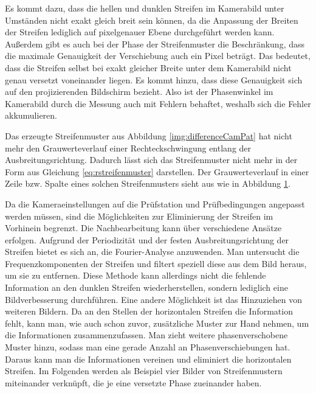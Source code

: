 \noindent
Es kommt dazu, dass die hellen und dunklen Streifen im Kamerabild unter Umständen nicht exakt gleich breit sein können, da die Anpassung der Breiten der Streifen lediglich auf pixelgenauer Ebene durchgeführt werden kann.
Außerdem gibt es auch bei der Phase der Streifenmuster die Beschränkung, dass die maximale Genauigkeit der Verschiebung auch ein Pixel beträgt.
Das bedeutet, dass die Streifen selbst bei exakt gleicher Breite unter dem Kamerabild nicht genau versetzt voneinander liegen.
Es kommt hinzu, dass diese Genauigkeit sich auf den projizierenden Bildschirm bezieht.
Also ist der Phasenwinkel im Kamerabild durch die Messung auch mit Fehlern behaftet, weshalb sich die Fehler akkumulieren.

\p
Das erzeugte Streifenmuster aus Abbildung \ref{img:differenceCamPat} hat nicht mehr den Grauwerteverlauf einer Rechteckschwingung entlang der Ausbreitungsrichtung.
Dadurch lässt sich das Streifenmuster nicht mehr in der Form aus Gleichung \ref{eq:rstreifenmuster} darstellen.
Der Grauwerteverlauf in einer Zeile bzw. Spalte eines solchen Streifenmusters sieht aus wie in Abbildung \ref{tikz:abbPulsewave}.
%
{
	\begin{figure}[H]
		\centering
		
		\label{tikz:abbPulsewave}
	\end{figure}
}
\p
Da die Kameraeinstellungen auf die Prüfstation und Prüfbedingungen angepasst werden müssen, sind die Möglichkeiten zur Eliminierung der Streifen im Vorhinein begrenzt.
Die Nachbearbeitung kann über verschiedene Ansätze erfolgen.
Aufgrund der Periodizität und der festen Ausbreitungsrichtung der Streifen bietet es sich an, die Fourier-Analyse anzuwenden.
Man untersucht die Frequenzkomponenten der Streifen und filtert speziell diese aus dem Bild heraus, um sie zu entfernen.
Diese Methode kann allerdings nicht die fehlende Information an den dunklen Streifen wiederherstellen, sondern lediglich eine Bildverbesserung durchführen.
Eine andere Möglichkeit ist das Hinzuziehen von weiteren Bildern.
Da an den Stellen der horizontalen Streifen die Information fehlt, kann man, wie auch schon zuvor, zusätzliche Muster zur Hand nehmen, um die Informationen zusammenzufassen.
Man zieht weitere phasenverschobene Muster hinzu, sodass man eine gerade Anzahl an Phasenverschiebungen hat.
Daraus kann man die Informationen vereinen und eliminiert die horizontalen Streifen.
Im Folgenden werden als Beispiel vier Bilder von Streifenmustern miteinander verknüpft, die je eine versetzte Phase zueinander haben.
